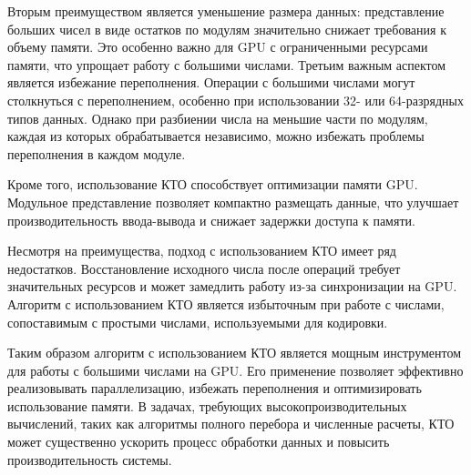 \documentclass[10pt]{article}
\begin{document}
Вторым преимуществом является уменьшение размера данных: представление больших чисел в виде остатков по модулям значительно снижает требования к объему памяти. Это особенно важно для GPU с ограниченными ресурсами памяти, что упрощает работу с большими числами. Третьим важным аспектом является избежание переполнения. Операции с большими числами могут столкнуться с переполнением, особенно при использовании 32- или 64-разрядных типов данных. Однако при разбиении числа на меньшие части по модулям, каждая из которых обрабатывается независимо, можно избежать проблемы переполнения в каждом модуле.

Кроме того, использование КТО способствует оптимизации памяти GPU. Модульное представление позволяет компактно размещать данные, что улучшает производительность ввода-вывода и снижает задержки доступа к памяти.

Несмотря на преимущества, подход с использованием КТО имеет ряд недостатков. Восстановление исходного числа после операций требует значительных ресурсов и может замедлить работу из-за синхронизации на GPU. Алгоритм с использованием КТО является избыточным при работе с числами, сопоставимым с простыми числами, используемыми для кодировки.

Таким образом алгоритм с использованием КТО является мощным инструментом для работы с большими числами на GPU. Его применение позволяет эффективно реализовывать параллелизацию, избежать переполнения и оптимизировать использование памяти. В задачах, требующих высокопроизводительных вычислений, таких как алгоритмы полного перебора и численные расчеты, КТО может существенно ускорить процесс обработки данных и повысить производительность системы.
\end{document}
